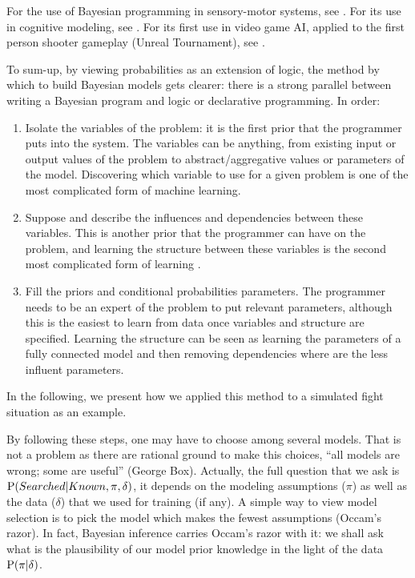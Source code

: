 For the use of Bayesian programming in sensory-motor systems, see \citep{PRDMSMS}. For its use in cognitive modeling, see \citep{Colas10}. For its first use in video game AI, applied to the first person shooter gameplay (Unreal Tournament), see \citep{LeHy04}.

To sum-up, by viewing probabilities as an extension of logic, the method by which to build Bayesian models gets clearer: there is a strong parallel between writing a Bayesian program and logic or declarative programming. In order:
\begin{enumerate}
    \item Isolate the variables of the problem: it is the first prior that the programmer puts into the system. The variables can be anything, from existing input or output values of the problem to abstract/aggregative values or parameters of the model. Discovering which variable to use for a given problem is one of the most complicated form of machine learning.
    \item Suppose and describe the influences and dependencies between these variables. This is another prior that the programmer can have on the problem, and learning the structure between these variables is the second most complicated form of learning \citep{Fra04b,Ler05a}.
    \item Fill the priors and conditional probabilities parameters. The programmer needs to be an expert of the problem to put relevant parameters, although this is the easiest to learn from data once variables and structure are specified. Learning the structure can be seen as learning the parameters of a fully connected model and then removing dependencies where are the less influent parameters.%
\end{enumerate}
In the following, we present how we applied this method to a simulated  fight situation as an example.

By following these steps, one may have to choose among several models. That is not a problem as there are rational ground to make this choices, ``all models are wrong; some are useful'' (George Box). %
Actually, the full question that we ask is $\mathrm{P}(Searched|Known, \pi, \delta)$, it depends on the modeling assumptions ($\pi$) as well as the data ($\delta$) that we used for training (if any). A simple way to view model selection is to pick the model which makes the fewest assumptions (Occam's razor). In fact, Bayesian inference carries Occam's razor with it: we shall ask what is the plausibility of our model prior knowledge in the light of the data $\mathrm{P}(\pi|\delta)$. 


